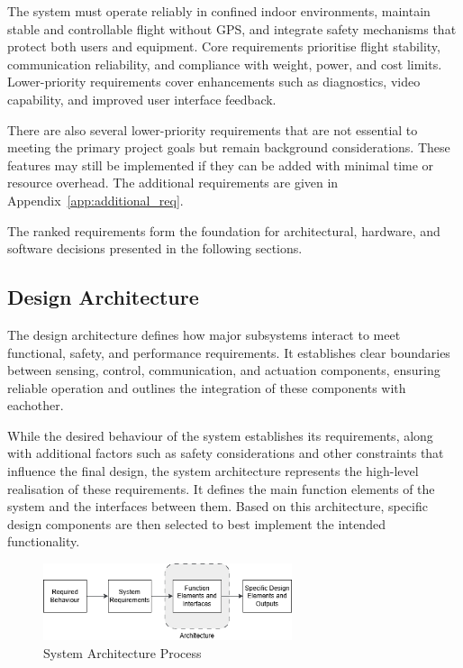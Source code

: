 The system must operate reliably in confined indoor environments, maintain stable and controllable flight without GPS, and integrate safety mechanisms that protect both users and equipment. Core requirements prioritise flight stability, communication reliability, and compliance with weight, power, and cost limits. Lower-priority requirements cover enhancements such as diagnostics, video capability, and improved user interface feedback.

There are also several lower-priority requirements that are not essential to meeting the primary project goals but remain background considerations. These features may still be implemented if they can be added with minimal time or resource overhead. The additional requirements are given in Appendix~\ref{app:additional_req}.

The ranked requirements form the foundation for architectural, hardware, and software decisions presented in the following sections.

\subsection{Design Architecture}

The design architecture defines how major subsystems interact to meet functional, safety, and performance requirements. It establishes clear boundaries between sensing, control, communication, and actuation components, ensuring reliable operation and outlines the integration of these components with eachother.

While the desired behaviour of the system establishes its requirements, along with additional factors such as safety considerations and other constraints that influence the final design, the system architecture represents the high-level realisation of these requirements. It defines the main function elements of the system and the interfaces between them. Based on this architecture, specific design components are then selected to best implement the intended functionality.

\begin{figure}[H]
    \centering
    \captionsetup{justification=centering, margin=1cm}
    \includegraphics[width=0.65\textwidth]{img/arch-process.PNG}
    \caption{System Architecture Process}
    \label{fig:arch-process}
\end{figure}

